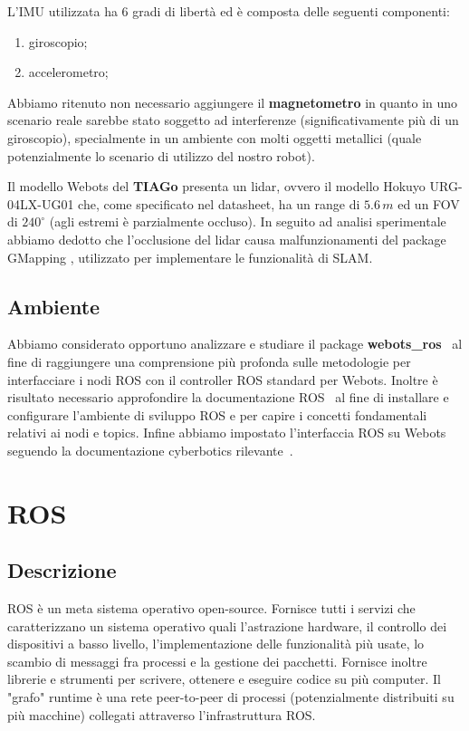 \documentclass[a4paper]{article}
\begin{document}
	L'IMU utilizzata ha 6 gradi di libertà ed è composta delle seguenti
	componenti:
	\begin{enumerate}
		\item giroscopio;	
		\item accelerometro;
	\end{enumerate}
	Abbiamo ritenuto non necessario aggiungere il \textbf{magnetometro} in quanto in uno scenario reale sarebbe stato soggetto ad interferenze (significativamente più di un giroscopio), specialmente in un ambiente con molti oggetti metallici (quale potenzialmente lo scenario di utilizzo del nostro robot).
	
	Il modello Webots del \textbf{TIAGo} presenta un lidar, ovvero il modello Hokuyo URG-04LX-UG01 \cite{lidarspecs} che, come specificato nel datasheet,  ha un range di $5.6\,m$ ed un FOV di $240^{\circ}$ (agli estremi è parzialmente occluso). In seguito ad analisi sperimentale abbiamo dedotto che l'occlusione del lidar causa malfunzionamenti del package GMapping \cite{grisettiyz2005improving}, utilizzato per implementare le funzionalità di SLAM.

	\subsection{Ambiente}\label{subsec:Ambiente} 

	Abbiamo considerato opportuno analizzare e studiare il package
	\textbf{webots\_ros}~\cite{cyberbotics} al fine di raggiungere una
	comprensione più profonda sulle metodologie per interfacciare i nodi ROS
	con il controller ROS standard per Webots. Inoltre è risultato necessario
	approfondire la documentazione ROS~\cite{ros.org} al fine di installare e
	configurare l'ambiente di sviluppo ROS e per capire i concetti fondamentali
	relativi ai nodi e topics. Infine abbiamo impostato l'interfaccia ROS su
	Webots seguendo la documentazione cyberbotics
	rilevante~\cite{webotsRosSetup}.  

	\section{ROS}\label{sec:Ros}
	\subsection{Descrizione}\label{subsec:Descrizione}
	ROS \cite{ros.org} è un meta sistema operativo open-source. Fornisce tutti
	i servizi che caratterizzano un sistema operativo quali l'astrazione
	hardware, il controllo dei dispositivi a basso livello,
	l'implementazione delle funzionalità più usate, lo scambio di messaggi fra
	processi e la gestione dei pacchetti. Fornisce inoltre librerie e strumenti
	per scrivere, ottenere e eseguire codice su più computer. Il "grafo"
	runtime è una rete peer-to-peer di processi (potenzialmente distribuiti su
	più macchine) collegati attraverso l'infrastruttura ROS. 
	
\end{document}
